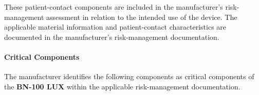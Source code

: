 These patient-contact components are included in the manufacturer's
risk-management assessment in relation to the intended use of
the device. The applicable material information and patient-contact
characteristics are documented in the manufacturer's
risk-management documentation.


\paragraph{Critical Components}

The manufacturer identifies the following components as critical
components of the \textbf{BN-100 LUX} within the applicable
risk-management documentation.

\begingroup

\raggedbottom
\setlength{\LTpre}{0pt}
\setlength{\LTpost}{0pt}
\setlength{\LTleft}{0pt}
\setlength{\LTright}{0pt}
\setlength{\tabcolsep}{3pt}
\renewcommand{\arraystretch}{1.15}

